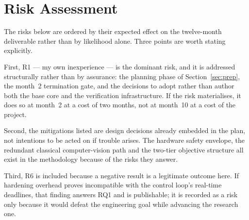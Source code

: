 \documentclass[11pt,a4paper]{article}
\begin{document}
\section{Risk Assessment}

The risks below are ordered by their expected effect on the twelve-month
deliverable rather than by likelihood alone. Three points are worth stating
explicitly.

First, R1 --- my own inexperience --- is the dominant risk, and it is addressed
structurally rather than by assurance: the planning phase of Section~\ref{sec:prep}, the
month~2 termination gate, and the decisions to adopt rather than author both the
base core and the verification infrastructure. If the risk materialises, it does
so at month~2 at a cost of two months, not at month~10 at a cost of the project.

Second, the mitigations listed are design decisions already embedded in the plan,
not intentions to be acted on if trouble arises. The hardware safety envelope,
the redundant classical computer-vision path and the two-tier objective structure
all exist in the methodology because of the risks they answer.

Third, R6 is included because a negative result is a legitimate outcome here. If
hardening overhead proves incompatible with the control loop's real-time
deadlines, that finding answers RQ1 and is publishable; it is recorded as a risk
only because it would defeat the engineering goal while advancing the research
one.
\end{document}
